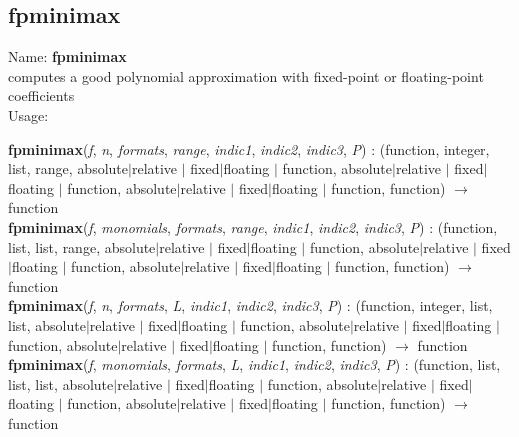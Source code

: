 \subsection{fpminimax}
\label{labfpminimax}
\noindent Name: \textbf{fpminimax}\\
computes a good polynomial approximation with fixed-point or floating-point coefficients\\
\noindent Usage: 
\begin{center}
\textbf{fpminimax}(\emph{f}, \emph{n}, \emph{formats}, \emph{range}, \emph{indic1}, \emph{indic2}, \emph{indic3}, \emph{P}) : (\textsf{function}, \textsf{integer}, \textsf{list}, \textsf{range}, \textsf{absolute$|$relative} $|$ \textsf{fixed$|$floating} $|$ \textsf{function}, \textsf{absolute$|$relative} $|$ \textsf{fixed$|$floating} $|$ \textsf{function}, \textsf{absolute$|$relative} $|$ \textsf{fixed$|$floating} $|$ \textsf{function}, \textsf{function}) $\rightarrow$ \textsf{function}\\
\textbf{fpminimax}(\emph{f}, \emph{monomials}, \emph{formats}, \emph{range}, \emph{indic1}, \emph{indic2}, \emph{indic3}, \emph{P}) : (\textsf{function}, \textsf{list}, \textsf{list}, \textsf{range},  \textsf{absolute$|$relative} $|$ \textsf{fixed$|$floating} $|$ \textsf{function}, \textsf{absolute$|$relative} $|$ \textsf{fixed$|$floating} $|$ \textsf{function}, \textsf{absolute$|$relative} $|$ \textsf{fixed$|$floating} $|$ \textsf{function}, \textsf{function}) $\rightarrow$ \textsf{function}\\
\textbf{fpminimax}(\emph{f}, \emph{n}, \emph{formats}, \emph{L}, \emph{indic1}, \emph{indic2}, \emph{indic3}, \emph{P}) : (\textsf{function}, \textsf{integer}, \textsf{list}, \textsf{list},  \textsf{absolute$|$relative} $|$ \textsf{fixed$|$floating} $|$ \textsf{function}, \textsf{absolute$|$relative} $|$ \textsf{fixed$|$floating} $|$ \textsf{function}, \textsf{absolute$|$relative} $|$ \textsf{fixed$|$floating} $|$ \textsf{function}, \textsf{function}) $\rightarrow$ \textsf{function}\\
\textbf{fpminimax}(\emph{f}, \emph{monomials}, \emph{formats}, \emph{L}, \emph{indic1}, \emph{indic2}, \emph{indic3}, \emph{P}) : (\textsf{function}, \textsf{list}, \textsf{list}, \textsf{list},  \textsf{absolute$|$relative} $|$ \textsf{fixed$|$floating} $|$ \textsf{function}, \textsf{absolute$|$relative} $|$ \textsf{fixed$|$floating} $|$ \textsf{function}, \textsf{absolute$|$relative} $|$ \textsf{fixed$|$floating} $|$ \textsf{function}, \textsf{function}) $\rightarrow$ \textsf{function}\\
\end{center}
